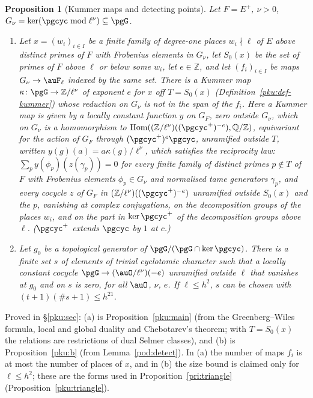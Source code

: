 \documentclass[10pt]{amsart}
\newtheorem{proposition}[theorem]{Proposition}
\theoremstyle{definition}
\theoremstyle{remark}
\newcommand{\Z}{\mathbb Z}
\newcommand{\Q}{\mathbb Q}
\begin{document}
\begin{proposition}[Kummer maps and detecting points]\label{pri:kummer}
Let $F=E^+$, $\nu>0$, $G_\nu=\ker(\pgcyc\bmod\ell^\nu)\subseteq\pgG$.
\begin{enumerate}
\item[(a)] Let $x=(w_i)_{i\in I}$ be a finite family of degree-one places $w_i\nmid\ell$ of $E$ above
distinct primes of $F$ with Frobenius elements in $G_\nu$, let $S_0(x)$ be the set of primes of $F$
above $\ell$ or below some $w_i$, let $e\in\Z$, and let $(f_i)_{i\in I}$ be maps $G_\nu\to\auF_\ell$
indexed by the same set. There is a Kummer map $\kappa\colon\pgG\to\Z/\ell^\nu$ of exponent $e$ for
$x$ off $T=S_0(x)$ (Definition~\ref{pku:def-kummer}) whose reduction on $G_\nu$ is not in the span
of the $f_i$. Here a Kummer map is given by a locally constant function $y$ on $G_F$, zero outside
$G_\nu$, which on $G_\nu$ is a homomorphism to $\operatorname{Hom}((\Z/\ell^\nu)((\pgcyc^+)^{-e}),\Q/\Z)$,
equivariant for the action of $G_F$ through $(\pgcyc^+)^{e}\pgcyc$, unramified outside $T$,
written $y(g)(a)=a\kappa(g)/\ell^\nu$, which satisfies the reciprocity law:
$\sum_p y(\phi_p)(z(\gamma_p))=0$ for every finite family of distinct primes $p\notin T$ of $F$ with
Frobenius elements $\phi_p\in G_\nu$ and normalised tame generators $\gamma_p$, and every cocycle
$z$ of $G_F$ in $(\Z/\ell^\nu)((\pgcyc^+)^{-e})$ unramified outside $S_0(x)$ and the $p$, vanishing at
complex conjugations, on the decomposition groups of the places $w_i$, and on the part in
$\ker\pgcyc^+$ of the decomposition groups above $\ell$. ($\pgcyc^+$ extends $\pgcyc$ by $1$ at $c$.)
\item[(b)] Let $g_0$ be a topological generator of $\pgG/(\pgG\cap\ker\pgcyc)$. There is a finite set
$s$ of elements of trivial cyclotomic character such that a locally constant cocycle
$\pgG\to(\auO/\ell^\nu)(-e)$ unramified outside $\ell$ that vanishes at $g_0$ and on $s$ is zero,
for all $\auO$, $\nu$, $e$. If $\ell\le h^2$, $s$ can be chosen with $(t+1)(\#s+1)\le h^{21}$.
\end{enumerate}
\end{proposition}
\noindent Proved in \S\ref{pku:sec}: (a) is Proposition~\ref{pku:main} (from the Greenberg--Wiles
formula, local and global duality and Chebotarev's theorem; with $T=S_0(x)$ the relations are
restrictions of dual Selmer classes), and (b) is Proposition~\ref{pku:b} (from
Lemma~\ref{pod:detect}). In (a) the number of maps $f_i$ is at most the number of places of $x$, and
in (b) the size bound is claimed only for $\ell\le h^2$; these are the forms used in
Proposition~\ref{pri:triangle} (Proposition~\ref{pku:triangle}).\par\smallskip
\end{document}
